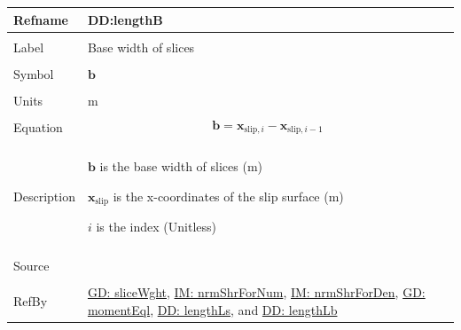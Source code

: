 \documentclass[12pt]{article}
\begin{document}
\noindent \begin{minipage}{\textwidth}
\begin{tabular}{>{\raggedright}p{}>{\raggedright\arraybackslash}p{}}
\toprule \textbf{Refname} & \textbf{DD:lengthB}
\label{DD:lengthB}
\\ \midrule \\
Label & Base width of slices
\\ \midrule \\
Symbol & $\mathbf{b}$
\\ \midrule \\
Units & m
\\ \midrule \\
Equation & \begin{displaymath}
           \mathbf{b}={\mathbf{x}_{\text{slip},i}}-{\mathbf{x}_{\text{slip},i-1}}
           \end{displaymath}
\\ \midrule \\
Description & \begin{symbDescription}
              \item{$\mathbf{b}$ is the base width of slices (m)}
              \item{${\mathbf{x}_{\text{slip}}}$ is the x-coordinates of the slip surface (m)}
              \item{$i$ is the index (Unitless)}
              \end{symbDescription}
\\ \midrule \\
Source & \cite{fredlund1977}
\\ \midrule \\
RefBy & \hyperref[GD:sliceWght]{GD: sliceWght}, \hyperref[IM:nrmShrForNum]{IM: nrmShrForNum}, \hyperref[IM:nrmShrForDen]{IM: nrmShrForDen}, \hyperref[GD:momentEql]{GD: momentEql}, \hyperref[DD:lengthLs]{DD: lengthLs}, and \hyperref[DD:lengthLb]{DD: lengthLb}
\\ \bottomrule
\end{tabular}
\end{minipage}
\par~
\end{document}
